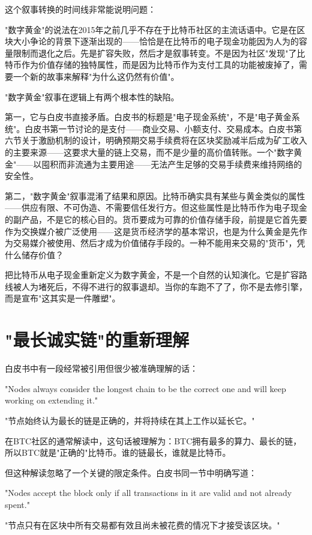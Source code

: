 \documentclass[a4paper,12pt,openany]{ctexbook}
\newenvironment{quoting}{%
  \par\vspace{0.5em}%
  \begin{list}{}{%
    \setlength{\leftmargin}{2em}%
    \setlength{\rightmargin}{2em}%
    \setlength{\parsep}{0.3em}%
    \setlength{\itemsep}{0pt}%
    \setlength{\topsep}{0pt}%
  }%
  \item\relax
}{%
  \end{list}%
  \par\vspace{0.5em}%
}
\begin{document}
这个叙事转换的时间线非常能说明问题：

"数字黄金"的说法在2015年之前几乎不存在于比特币社区的主流话语中。它是在区块大小争论的背景下逐渐出现的——恰恰是在比特币的电子现金功能因为人为的容量限制而退化之后。先是扩容失败，然后才是叙事转变。不是因为社区"发现"了比特币作为价值存储的独特属性，而是因为比特币作为支付工具的功能被废掉了，需要一个新的故事来解释"为什么这仍然有价值"。

"数字黄金"叙事在逻辑上有两个根本性的缺陷。

第一，它与白皮书直接矛盾。白皮书的标题是"电子现金系统"，不是"电子黄金系统"。白皮书第一节讨论的是支付——商业交易、小额支付、交易成本。白皮书第六节关于激励机制的设计，明确预期交易手续费将在区块奖励减半后成为矿工收入的主要来源——这要求大量的链上交易，而不是少量的高价值转账。一个"数字黄金"——以囤积而非流通为主要用途——无法产生足够的交易手续费来维持网络的安全性。

第二，"数字黄金"叙事混淆了结果和原因。比特币确实具有某些与黄金类似的属性——供应有限、不可伪造、不需要信任发行方。但这些属性是比特币作为电子现金的副产品，不是它的核心目的。货币要成为可靠的价值存储手段，前提是它首先要作为交换媒介被广泛使用——这是货币经济学的基本常识，也是为什么黄金是先作为交易媒介被使用、然后才成为价值储存手段的。一种不能用来交易的"货币"，凭什么储存价值？

把比特币从电子现金重新定义为数字黄金，不是一个自然的认知演化。它是扩容路线被人为堵死后，不得不进行的叙事退却。当你的车跑不了了，你不是去修引擎，而是宣布"这其实是一件雕塑"。


\section*{"最长诚实链"的重新理解}


白皮书中有一段经常被引用但很少被准确理解的话：


\begin{quoting}
\small
"Nodes always consider the longest chain to be the correct one and will keep working on extending it."

"节点始终认为最长的链是正确的，并将持续在其上工作以延长它。"
\end{quoting}


在BTC社区的通常解读中，这句话被理解为：BTC拥有最多的算力、最长的链，所以BTC就是"正确的"比特币。谁的链最长，谁就是比特币。

但这种解读忽略了一个关键的限定条件。白皮书同一节中明确写道：


\begin{quoting}
\small
"Nodes accept the block only if all transactions in it are valid and not already spent."

"节点只有在区块中所有交易都有效且尚未被花费的情况下才接受该区块。"
\end{quoting}
\end{document}
